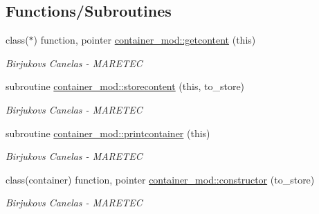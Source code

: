 \subsection*{Functions/\+Subroutines}
\begin{DoxyCompactItemize}
\item 
class($\ast$) function, pointer \hyperlink{namespacecontainer__mod_a23a016e747d896622127c0c21dca9836}{container\+\_\+mod\+::getcontent} (this)
\begin{DoxyCompactList}\small\item\em Birjukovs Canelas -\/ M\+A\+R\+E\+T\+EC \end{DoxyCompactList}\item 
subroutine \hyperlink{namespacecontainer__mod_ace49cee012b6cd3c41c03556ab0dd884}{container\+\_\+mod\+::storecontent} (this, to\+\_\+store)
\begin{DoxyCompactList}\small\item\em Birjukovs Canelas -\/ M\+A\+R\+E\+T\+EC \end{DoxyCompactList}\item 
subroutine \hyperlink{namespacecontainer__mod_abf1785185971a527e437d3a489462724}{container\+\_\+mod\+::printcontainer} (this)
\begin{DoxyCompactList}\small\item\em Birjukovs Canelas -\/ M\+A\+R\+E\+T\+EC \end{DoxyCompactList}\item 
class(container) function, pointer \hyperlink{namespacecontainer__mod_a6262df4ff34024d566cf8261dc20a248}{container\+\_\+mod\+::constructor} (to\+\_\+store)
\begin{DoxyCompactList}\small\item\em Birjukovs Canelas -\/ M\+A\+R\+E\+T\+EC \end{DoxyCompactList}\end{DoxyCompactItemize}
